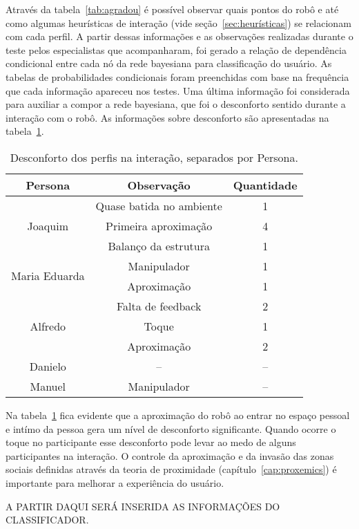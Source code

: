 Através da tabela~\ref{tab:agradou} é possível observar quais pontos do robô e até como algumas heurísticas de interação (vide seção~\ref{sec:heurísticas}) se relacionam com cada perfil. A partir dessas informações e as observações realizadas durante o teste pelos especialistas que acompanharam, foi gerado a relação de dependência condicional entre cada nó da rede bayesiana para classificação do usuário. As tabelas de probabilidades condicionais foram preenchidas com base na frequência que cada informação apareceu nos testes. Uma última informação foi considerada para auxiliar a compor a rede bayesiana, que foi o desconforto sentido durante a interação com o robô. As informações sobre desconforto são apresentadas na tabela~\ref{tab:desconforto}.

\begin{table}[!ht]
	\caption{Desconforto dos perfis na interação, separados por Persona.}
	\label{tab:desconforto}
	\centering
	\begin{tabular}{c | c | c }
        \hline
        Persona & Observação & Quantidade \\
        \hline
        \multirow{3}{*}{Joaquim} & Quase batida no ambiente & 1 \\
        \hhline{~--}
        & Primeira aproximação & 4 \\
        \hhline{~--}
        & Balanço da estrutura & 1 \\
        \hline
        \multirow{2}{*}{Maria Eduarda} & Manipulador & 1 \\
        \hhline{~--}
        & Aproximação & 1 \\
        \hline
        \multirow{3}{*}{Alfredo} & Falta de feedback & 2 \\
        \hhline{~--}
        & Toque & 1 \\
        \hhline{~--}
        & Aproximação & 2 \\
        \hline
        Danielo & -- & -- \\
        \hline
        Manuel & Manipulador & -- \\
        \hline
    \end{tabular}
\end{table}

Na tabela~\ref{tab:desconforto} fica evidente que a aproximação do robô ao entrar no espaço pessoal e intímo da pessoa gera um nível de desconforto significante. Quando ocorre o toque no participante esse desconforto pode levar ao medo de alguns participantes na interação. O controle da aproximação e da invasão das zonas sociais definidas através da teoria de proximidade (capítulo~\ref{cap:proxemics}) é importante para melhorar a experiência do usuário.

A PARTIR DAQUI SERÁ INSERIDA AS INFORMAÇÕES DO CLASSIFICADOR.
